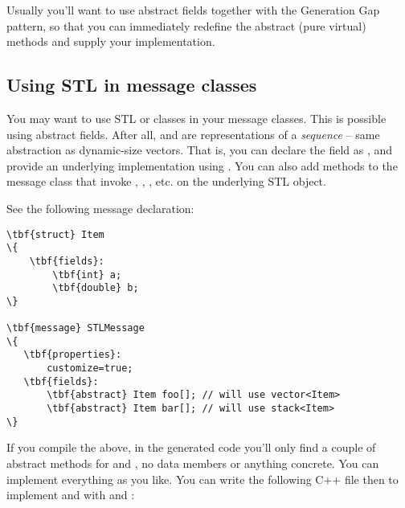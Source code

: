 Usually you'll want to use abstract fields together with
the Generation Gap pattern, so that you can immediately
redefine the abstract (pure virtual) methods and
supply your implementation.



\subsection{Using STL in message classes}

You may want to use STL  or  classes in your message classes.
This is possible using abstract fields. After all,  and 
are representations of a \textit{sequence} -- same abstraction as dynamic-size vectors.
That is, you can declare the field as , and provide
an underlying implementation using . You can also add methods
to the message class that invoke , , , etc.
on the underlying STL object.

See the following message declaration:

\begin{Verbatim}[commandchars=\\\{\}]
\tbf{struct} Item
\{
    \tbf{fields}:
        \tbf{int} a;
        \tbf{double} b;
\}

\tbf{message} STLMessage
\{
   \tbf{properties}:
       customize=true;
   \tbf{fields}:
       \tbf{abstract} Item foo[]; // will use vector<Item>
       \tbf{abstract} Item bar[]; // will use stack<Item>
\}
\end{Verbatim}

If you compile the above, in the generated code you'll only find a couple of
abstract methods for  and , no data members or anything concrete.
You can implement everything as you like. You can write the following C++ file
then to implement  and  with  and :

